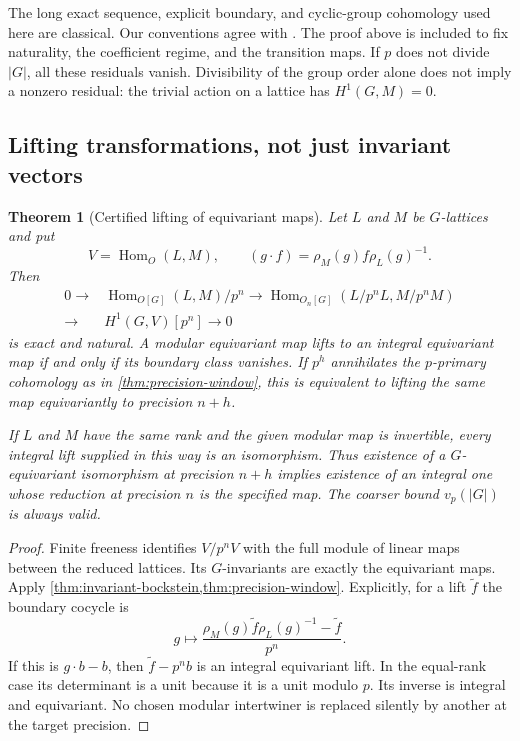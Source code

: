 \documentclass[11pt]{article}
\newtheorem{theorem}{Theorem}[section]
\theoremstyle{definition}
\theoremstyle{remark}
\begin{document}
The long exact sequence, explicit boundary, and cyclic-group cohomology used here are classical. Our conventions agree with \cite[Chapter II, 1.9, 1.18--1.21]{MilneCFT2020}. The proof above is included to fix naturality, the coefficient regime, and the transition maps. If $p$ does not divide $|G|$, all these residuals vanish. Divisibility of the group order alone does not imply a nonzero residual: the trivial action on a lattice has $H^1(G,M)=0$.

\subsection{Lifting transformations, not just invariant vectors}

\begin{theorem}[Certified lifting of equivariant maps]\label{thm:intertwiner-lifting}
Let $L$ and $M$ be $G$-lattices and put
\[
 V=\operatorname{Hom}_O(L,M),\qquad
 (g\cdot f)=\rho_M(g)f\rho_L(g)^{-1}.
\]
Then
\[
 \begin{split}
 0\longrightarrow&\operatorname{Hom}_{O[G]}(L,M)/p^n
 \longrightarrow\operatorname{Hom}_{O_n[G]}(L/p^nL,M/p^nM)\\
 \longrightarrow&H^1(G,V)[p^n]\longrightarrow0
 \end{split}
\]
is exact and natural. A modular equivariant map lifts to an integral equivariant map if and only if its boundary class vanishes. If $p^h$ annihilates the $p$-primary cohomology as in \cref{thm:precision-window}, this is equivalent to lifting the same map equivariantly to precision $n+h$.

If $L$ and $M$ have the same rank and the given modular map is invertible, every integral lift supplied in this way is an isomorphism. Thus existence of a $G$-equivariant isomorphism at precision $n+h$ implies existence of an integral one whose reduction at precision $n$ is the specified map. The coarser bound $v_p(|G|)$ is always valid.
\end{theorem}
\begin{proof}
Finite freeness identifies $V/p^nV$ with the full module of linear maps between the reduced lattices. Its $G$-invariants are exactly the equivariant maps. Apply \cref{thm:invariant-bockstein,thm:precision-window}. Explicitly, for a lift $\widetilde f$ the boundary cocycle is
\[
 g\longmapsto\frac{\rho_M(g)\widetilde f\rho_L(g)^{-1}-\widetilde f}{p^n}.
\]
If this is $g\cdot b-b$, then $\widetilde f-p^n b$ is an integral equivariant lift. In the equal-rank case its determinant is a unit because it is a unit modulo $p$. Its inverse is integral and equivariant. No chosen modular intertwiner is replaced silently by another at the target precision.
\end{proof}
\end{document}
